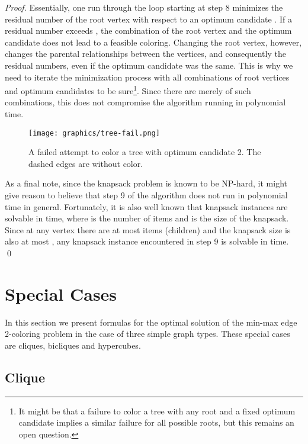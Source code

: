 \documentclass[runningheads, a4paper]{llncs}
\begin{document}
\begin{proof}
Essentially, one run through the loop starting at step 8 minimizes the residual number of the root vertex with respect to an optimum candidate . If a residual number exceeds , the combination of the root vertex and the optimum candidate does not lead to a feasible coloring. Changing the root vertex, however, changes the parental relationships between the vertices, and consequently the residual numbers, even if the optimum candidate was the same. This is why we need to iterate the minimization process with all combinations of root vertices and optimum candidates to be sure\footnote{It might be that a failure to color a tree with any root  and a fixed optimum candidate  implies a similar failure for all possible roots, but this remains an open question.}. Since there are merely  of such combinations, this does not compromise the algorithm running in polynomial time.

\begin{figure}[htb]
\centering \texttt{[image: graphics/tree-fail.png]}
\caption{A failed attempt to color a tree with optimum candidate 2. The dashed edges are without color.}\label{img:tree-fail}
\end{figure}

As a final note, since the knapsack problem is known to be NP-hard, it might give reason to believe that step 9 of the algorithm does not run in polynomial time in general. Fortunately, it is also well known that knapsack instances are solvable in  time, where  is the number of items and  is the size of the knapsack. Since at any vertex there are at most  items (children) and the knapsack size is also at most , any knapsack instance encountered in step 9 is solvable in  time. \qed

\end{proof}


\section{Special Cases}\label{sect:special}

In this section we present formulas for the optimal solution of the min-max edge 2-coloring problem in the case of three simple graph types. These special cases are cliques, bicliques and hypercubes.


\subsection{Clique}\label{ssect:clique}
\end{document}
